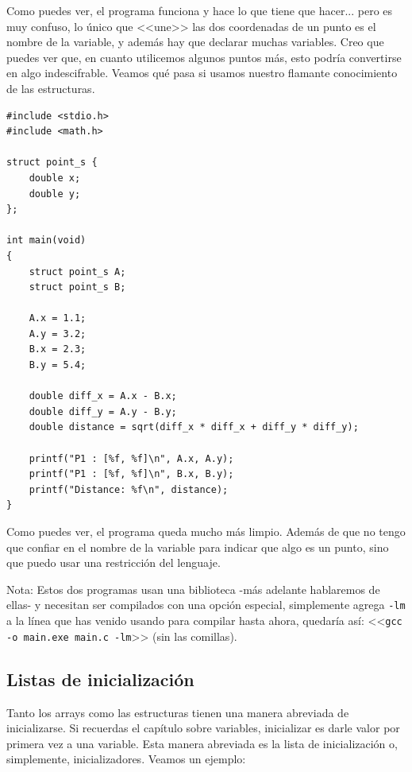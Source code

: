 \documentclass[a4paper]{article}
\begin{document}
Como puedes ver, el programa funciona y hace lo que tiene que hacer... pero
es muy confuso, lo único que <<une>> las dos coordenadas de un punto es el
nombre de la variable, y además hay que declarar muchas variables. Creo que
puedes ver que, en cuanto utilicemos algunos puntos más, esto podría convertirse
en algo indescifrable. Veamos qué pasa si usamos nuestro flamante conocimiento
de las estructuras.


\noindent
\begin{minipage}[H]{\linewidth}
\mbox{}
\begin{lstlisting}[style=C,
caption={Ejemplo de resolución de distancia entre puntos usando estructuras},
label={lst:pointStruct}]
#include <stdio.h>
#include <math.h>

struct point_s {
    double x;
    double y;
};

int main(void)
{
    struct point_s A;
    struct point_s B;

    A.x = 1.1;
    A.y = 3.2;
    B.x = 2.3;
    B.y = 5.4;

    double diff_x = A.x - B.x;
    double diff_y = A.y - B.y;
    double distance = sqrt(diff_x * diff_x + diff_y * diff_y);

    printf("P1 : [%f, %f]\n", A.x, A.y);
    printf("P1 : [%f, %f]\n", B.x, B.y);
    printf("Distance: %f\n", distance);
}
\end{lstlisting}
\end{minipage}


Como puedes ver, el programa queda mucho más limpio. Además de que
no tengo que confiar en el nombre de la variable para indicar que algo es un
punto, sino que puedo usar una restricción del lenguaje.

Nota: Estos dos programas usan una biblioteca -más adelante hablaremos de ellas-
y necesitan ser compilados con una opción especial, simplemente agrega
\texttt{-lm} a la línea que has venido usando para compilar hasta ahora,
quedaría así: <<\texttt{gcc -o main.exe main.c -lm}>> (sin las comillas).

\subsection{Listas de inicialización}

Tanto los arrays como las estructuras tienen una manera abreviada de
inicializarse. Si recuerdas el capítulo sobre variables, inicializar es darle
valor por primera vez a una variable. Esta manera abreviada es la
lista de inicialización o, simplemente, inicializadores. Veamos un ejemplo:
\end{document}
